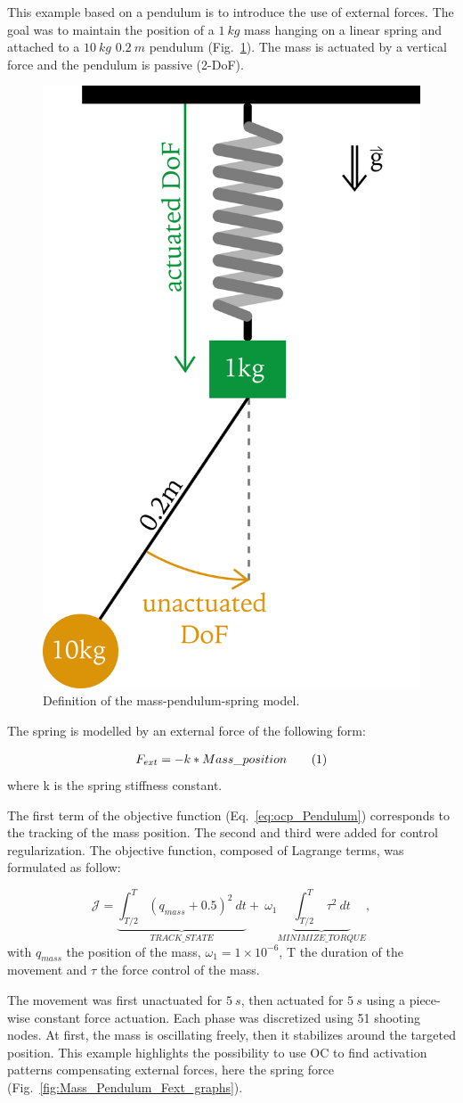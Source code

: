 This example based on a pendulum is to introduce the use of external forces.
The goal was to maintain the position of a $\SI{1}{kg}$ mass hanging on a linear spring and attached to a $\SI{10}{kg}$ $\SI{0.2}{m}$ pendulum (Fig.~\ref{fig:Mass_Pendulum_Model}).
The mass is actuated by a vertical force and the pendulum is passive (2-DoF).

\begin{figure}[t!]
\centering
\includegraphics[width=0.35\columnwidth]{figures/Mass_Pendulum_Model.png}
\caption{Definition of the mass-pendulum-spring model.}
\label{fig:Mass_Pendulum_Model}
\end{figure}

The spring is modelled by an external force of the following form:

\[
\begin{aligned}
F_{ext} = -k*Mass\_position
\end{aligned}
\addtag
\label{eq:f_ext}
\]
where k is the spring stiffness constant.


 
The first term of the objective function (Eq.~\ref{eq:ocp_Pendulum}) corresponds to the tracking of the mass position.
The second and third were added for control regularization.
The objective function, composed of Lagrange terms, was formulated as follow:


\[\label{eq:ocp_Pendulum}
\mathcal{J} = \underbrace{\int_{T/2}^T (q_{mass} + 0.5)^2~dt}_{TRACK\_STATE}  +~\omega_1 \underbrace{\int_{T/2}^T ~\tau^2~dt}_{MINIMIZE\_ TORQUE},
\]
\noindent with $q_{mass}$ the position of the mass, $\omega_1 = 1\times 10^{-6}$, T the duration of the movement and $\tau$ the force control of the mass.


The movement was first unactuated for $\SI{5}{s}$, then actuated for $\SI{5}{s}$ using a piece-wise constant force actuation.
Each phase was discretized using 51 shooting nodes.
At first, the mass is oscillating freely, then it stabilizes around the targeted position.
This example highlights the possibility to use OC to find activation patterns compensating external forces, here the spring force (Fig.~\ref{fig:Mass_Pendulum_Fext_graphs}).


